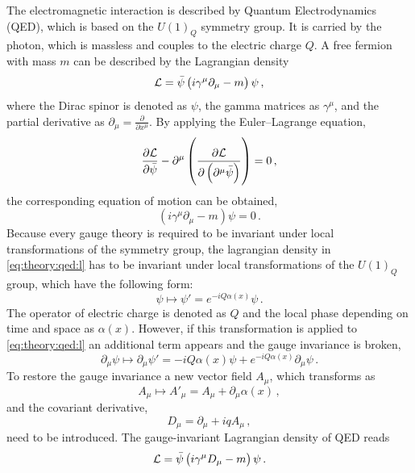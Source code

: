 The electromagnetic interaction is described by Quantum Electrodynamics (QED), which is based on the $U(1)_Q$ symmetry group.
It is carried by the photon, which is massless and couples to the electric charge $Q$.
A free fermion with mass $m$ can be described by the Lagrangian density
\begin{equation}
    \label{eq:theory:qed:l}
    \mathcal{L} = \bar{\psi} \left( i \gamma^\mu \partial_\mu - m\right) \psi \,,
\end{equation}
where the Dirac spinor is denoted as $\psi$, the gamma matrices as $\gamma^\mu$, and the partial derivative as $\partial_\mu = \frac{\partial}{\partial x^\mu}$.
By applying the Euler--Lagrange equation,
\begin{equation}
    \frac{\partial \mathcal{L}}{\partial \bar{\psi}} - \partial^\mu \left( \frac{\partial \mathcal{L}}{\partial \left(\partial^\mu \bar{\psi} \right)} \right) = 0 \,,
\end{equation}
the corresponding equation of motion can be obtained,
\begin{equation}
     \left( i \gamma^\mu \partial_\mu - m\right) \psi = 0\,.
\end{equation}
Because every gauge theory is required to be invariant under local transformations of the symmetry group, the lagrangian density in \cref{eq:theory:qed:l} has to be
invariant under local transformations of the $U(1)_Q$ group, which have the following form:
\begin{equation}
    \psi \mapsto \psi' = e^{-iQ\alpha(x)} \psi \,.
\end{equation}
The operator of electric charge is denoted as $Q$ and the local phase depending on time and space as $\alpha(x)$.
However, if this transformation is applied to \cref{eq:theory:qed:l} an additional term appears and the
gauge invariance is broken,
\begin{equation}
    \partial_\mu \psi \mapsto \partial_\mu \psi' = -i Q \alpha(x) \psi + e^{-iQ\alpha(x)} \partial_\mu \psi \,.
\end{equation}
To restore the gauge invariance a new vector field $A_\mu$, which transforms as
\begin{equation}
    A_\mu \mapsto A'_\mu = A_\mu + \partial_\mu \alpha(x) \,,
\end{equation}
and the covariant derivative,
\begin{equation}
    D_\mu = \partial_\mu + i q A_\mu \,,
\end{equation}
need to be introduced.
The gauge-invariant Lagrangian density of QED reads
\begin{equation}
    \mathcal{L} = \bar{\psi} \left( i \gamma^\mu D_\mu -m \right) \psi \,.
\end{equation}
